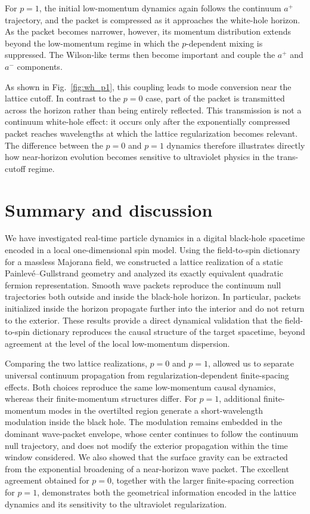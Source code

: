 \documentclass[reprint,amsmath,amssymb,aps,showkeys,superscriptaddress]{revtex4-2}
\begin{document}
For $p=1$, the initial low-momentum dynamics again follows the
continuum $a^+$ trajectory, and the packet is compressed as it
approaches the white-hole horizon. As the packet becomes narrower,
however, its momentum distribution extends beyond the low-momentum
regime in which the $p$-dependent mixing is suppressed. The
Wilson-like terms then become important and couple the $a^+$ and
$a^-$ components.

As shown in Fig.~\ref{fig:wh_p1}, this coupling leads to mode
conversion near the lattice cutoff. In contrast to the $p=0$ case,
part of the packet is transmitted across the horizon rather than
being entirely reflected. This transmission is not a continuum
white-hole effect: it occurs only after the exponentially compressed
packet reaches wavelengths at which the lattice regularization
becomes relevant. The difference between the $p=0$ and $p=1$
dynamics therefore illustrates directly how near-horizon evolution
becomes sensitive to ultraviolet physics in the trans-cutoff regime.

\section{Summary and discussion}
\label{sec:summary}

We have investigated real-time particle dynamics in a digital
black-hole spacetime encoded in a local one-dimensional spin model.
Using the field-to-spin dictionary for a massless Majorana field, we
constructed a lattice realization of a static
Painlev\'e--Gullstrand geometry and analyzed its exactly equivalent
quadratic fermion representation. Smooth wave packets reproduce the
continuum null trajectories both outside and inside the black-hole
horizon. In particular, packets initialized inside the horizon
propagate further into the interior and do not return to the
exterior. These results provide a direct dynamical validation that
the field-to-spin dictionary reproduces the causal structure of the
target spacetime, beyond agreement at the level of the local
low-momentum dispersion.

Comparing the two lattice realizations, $p=0$ and $p=1$, allowed us
to separate universal continuum propagation from
regularization-dependent finite-spacing effects. Both choices
reproduce the same low-momentum causal dynamics, whereas their
finite-momentum structures differ. For $p=1$, additional
finite-momentum modes in the overtilted region generate a
short-wavelength modulation inside the black hole. The modulation
remains embedded in the dominant wave-packet envelope, whose center
continues to follow the continuum null trajectory, and does not
modify the exterior propagation within the time window considered.
We also showed that the surface gravity can be extracted from the
exponential broadening of a near-horizon wave packet. The excellent
agreement obtained for $p=0$, together with the larger
finite-spacing correction for $p=1$, demonstrates both the
geometrical information encoded in the lattice dynamics and its
sensitivity to the ultraviolet regularization.
\end{document}
